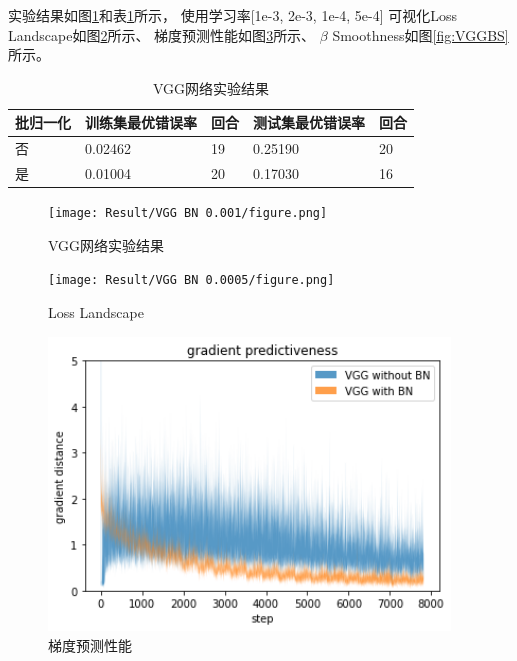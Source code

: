 \documentclass{article}
\begin{document}
实验结果如图\ref{fig:VGG}和表\ref{table:VGG}所示，
使用学习率[1e-3, 2e-3, 1e-4, 5e-4]
可视化Loss Landscape如图\ref{fig:VGGLL}所示、
梯度预测性能如图\ref{fig:VGGGP}所示、
$\beta$ Smoothness如图\ref{fig:VGGBS}所示。

\begin{table}[h]
\centering
\begin{tabular}{|l|l|l|l|l|} 
\hline
批归一化 & 训练集最优错误率 & 回合 & 测试集最优错误率 & 回合 \\
\hline
否 & 0.02462 & 19 & 0.25190 & 20 \\
是 & 0.01004 & 20 & 0.17030 & 16 \\
\hline
\end{tabular}
\caption{VGG网络实验结果}
\label{table:VGG}
\end{table}

\begin{figure}[h]
\texttt{[image: Result/VGG BN 0.001/figure.png]}
\caption{VGG网络实验结果}
\label{fig:VGG}
\end{figure}

\begin{figure}[h]
\texttt{[image: Result/VGG BN 0.0005/figure.png]}
\caption{Loss Landscape}
\label{fig:VGGLL}
\end{figure}

\begin{figure}[h]
\centering
\includegraphics[width=0.95\textwidth]
{Result/Gradient Predictiveness.png}
\caption{梯度预测性能}
\label{fig:VGGGP}
\end{figure}
\end{document}
